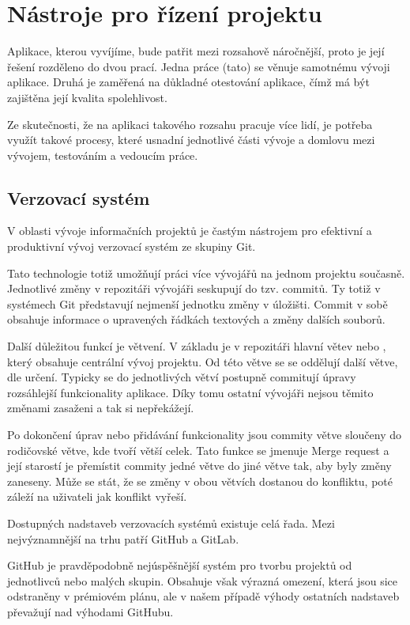 \documentclass[czech,BP]{thesiskiv}
\begin{document}
\section{Nástroje pro řízení projektu}
	\par Aplikace, kterou vyvíjíme, bude patřit mezi rozsahově náročnější, proto je její řešení rozděleno do dvou prací. Jedna práce (tato) se věnuje samotnému vývoji aplikace. Druhá je zaměřená na důkladné otestování aplikace, čímž má být zajištěna její kvalita spolehlivost.
	\par Ze skutečnosti, že na aplikaci takového rozsahu pracuje více lidí, je potřeba využít takové procesy, které usnadní jednotlivé části vývoje a domlovu mezi vývojem, testováním a vedoucím práce.
\subsection{Verzovací systém}
	\par V oblasti vývoje informačních projektů je častým nástrojem pro efektivní a produktivní vývoj verzovací systém ze skupiny Git.
	\par Tato technologie totiž umožňují práci více vývojářů na jednom projektu současně. Jednotlivé změny v repozitáři vývojáři seskupují do tzv. commitů. Ty totiž v systémech Git představují nejmenší jednotku změny v úložišti. Commit v sobě obsahuje informace o upravených řádkách textových a změny dalších souborů.
	\par Další důležitou funkcí je větvení. V základu je v repozitáři hlavní větev  nebo , který obsahuje centrální vývoj projektu. Od této větve se se oddělují další větve, dle určení. Typicky se do jednotlivých větví postupně commitují úpravy rozsáhlejší funkcionality aplikace. Díky tomu ostatní vývojáři nejsou těmito změnami zasaženi a tak si nepřekážejí.
	\par Po dokončení úprav nebo přidávání funkcionality jsou commity větve sloučeny do rodičovské větve, kde tvoří větší celek. Tato funkce se jmenuje Merge request a její starostí je přemístit commity jedné větve do jiné větve tak, aby byly změny zaneseny. Může se stát, že se změny v obou větvích dostanou do konfliktu, poté záleží na uživateli jak konflikt vyřeší.
	\par Dostupných nadstaveb verzovacích systémů existuje celá řada. Mezi nejvýznamnější na trhu patří GitHub a GitLab.
	\par GitHub je pravděpodobně nejúspěšnější systém pro tvorbu projektů od jednotlivců nebo malých skupin. Obsahuje však výrazná omezení, která jsou sice odstraněny v prémiovém plánu, ale v našem případě výhody ostatních nadstaveb převažují nad výhodami GitHubu.
\end{document}

